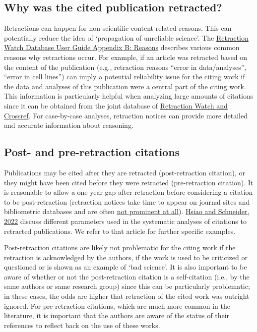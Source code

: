 \documentclass[letterpaper, 12pt]{article}
\begin{document}
\subsection*{Why was the cited publication retracted?} 

Retractions can happen for non-scientific content related reasons. This can potentially reduce the idea of ‘propagation of unreliable science’. The \href{https://retractionwatch.com/retraction-watch-database-user-guide/retraction-watch-database-user-guide-appendix-b-reasons/}{Retraction Watch Database User Guide Appendix B: Reasons} describes various common reasons why retractions occur. For example, if an article was retracted based on the content of the publication (e.g., retraction reasons ``error in data/analyses'', ``error in cell lines'') can imply a potential reliability issue for the citing work if the data and analyses of this publication were a central part of the citing work. This information is particularly helpful when analyzing large amounts of citations since it can be obtained from the joint database of \href{https://gitlab.com/crossref/retraction-watch-data}{Retraction Watch and Crossref}. For case-by-case analyses, retraction notices can provide more detailed and accurate information about reasoning. 

\subsection*{Post- and pre-retraction citations}

Publications may be cited after they are retracted (post-retraction citation), or they might have been cited before they were retracted (pre-retraction citation). 
It is reasonable to allow a one-year gap after retraction before considering a citation to be post-retraction (retraction notices take time to appear on journal sites and bibliometric databases and are often \href{https://retractionwatch.com/2024/07/05/how-you-can-help-improve-the-visibility-of-retractions-introducing-nisos-recommended-practice-for-communication-of-retractions-removals-and-expressions-of-concern-crec/}{not prominent at all}). \href{ https://doi.org/10.1162/qss_a_00155}{Hsiao and Schneider, 2022} discuss different parameters used in the systematic analyses of citations to retracted publications. We refer to that article for further specific examples.  

Post-retraction citations are likely not problematic for the citing work if the retraction is acknowledged by the authors, if the work is used to be criticized or questioned or is shown as an example of `bad science'. It is also important to be aware of whether or not the post-retraction citation is a self-citation (i.e., by the same authors or same research group) since this can be particularly problematic; in these cases, the odds are higher that retraction of the cited work was outright ignored. For pre-retraction citations, which are much more common in the literature, it is important that the authors are aware of the status of their references to reflect back on the use of these works. 
\end{document}

